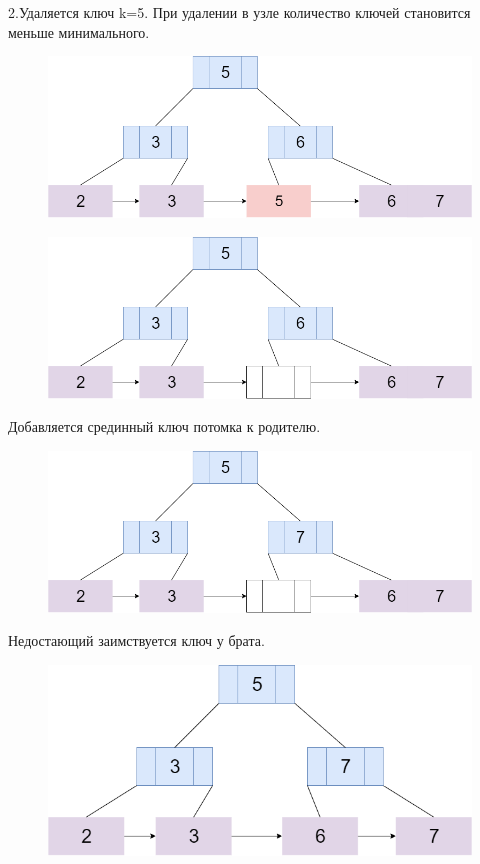 \documentclass{article}
\begin{document}
   2.Удаляется ключ k=5. При удалении в узле количество ключей становится меньше минимального.
   \begin{figure}
      \includegraphics[scale=0.4]{dell3.png}

\caption{}
\end{figure}
   
      \begin{figure}
      \includegraphics[scale=0.4]{dell4.png}

\caption{}
\end{figure}

  Добавляется срединный ключ потомка к родителю.
  \begin{figure}
      \includegraphics[scale=0.4]{dell5.png}

\caption{}
\end{figure}


    Недостающий заимствуется ключ у брата. 
    \begin{figure}       
    \includegraphics[scale=0.4]{dell6.png}


\caption{}
\end{figure}
\end{document}
